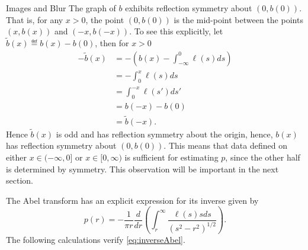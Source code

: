 \begin{chapter}{Images and Blur}
  The graph of $b$ exhibits reflection symmetry about $(0,b(0))$.
  That is, for any $x>0$, the point $(0,b(0))$ is the mid-point between the points $(x,b(x))$ and $(-x,b(-x))$. 
  To see this explicitly, let $\tilde b(x) \eqdef b(x) - b(0)$, then for $x>0$
  \begin{align}
    -\tilde b(x) &= -\left(b(x) - \int_{-\infty}^0 \ell(s)ds\right) \nonumber \\
      &= -\int_0^x \ell(s)ds \nonumber \\
      &= \int_0^{-x}\ell(s')ds'  \nonumber \\
      &= b(-x) - b(0) \nonumber\\
      &= \tilde b(-x).
  \end{align}
  Hence $\tilde b(x)$ is odd and has reflection symmetry about the origin, hence, $b(x)$ has reflection symmetry about $(0,b(0))$.
  This means that data defined on either $x\in(-\infty,0]$ or $x\in[0,\infty)$ is sufficient for estimating $p$, since the other half is determined by symmetry.
  This observation will be important in the next section.

  The Abel transform has an explicit expression for its inverse \citep{epstein2008} given by
  \begin{equation} \label{eq:inverseAbel}
    p(r) = -\frac{1}{\pi r} \frac{d}{dr}\left(\int_r^\infty \frac{\ell(s) s ds}{ (s^2 - r^2)^{1/2} } \right).  
  \end{equation} 
  The following calculations verify \eqref{eq:inverseAbel}.


\end{chapter}
